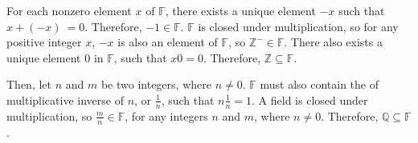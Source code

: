\documentclass{article}
\begin{document}
\begin{enumerate}[listparindent=\parindent]
For each nonzero element \(x\) of \(\mathbb F\), there exists a unique element \(-x\) such that \(x + (-x)\ = 0\).
Therefore, \(-1 \in \mathbb F\).
\(\mathbb F\) is closed under multiplication, so for any positive integer \(x\), \(-x\) is also an element of \(\mathbb F\), 
so \(\mathbb Z^- \in \mathbb F\).
There also exists a unique element \(0\) in \(\mathbb F\), such that \(x0 = 0\).
Therefore, \(\mathbb Z \subseteq \mathbb F\).

Then, let \(n\) and \(m\) be two integers, where \(n \neq 0\).
\(\mathbb F\) must also contain the of multiplicative inverse of \(n\), or \(\frac{1}{n}\), such that \(n\frac{1}{n} = 1\).
A field is closed under multiplication, so \(\frac{m}{n} \in \mathbb F\),
for any integers \(n\) and \(m\), where \(n \neq 0\).
Therefore, \(\mathbb Q \subseteq \mathbb F\).

\end{enumerate}
\end{document}
